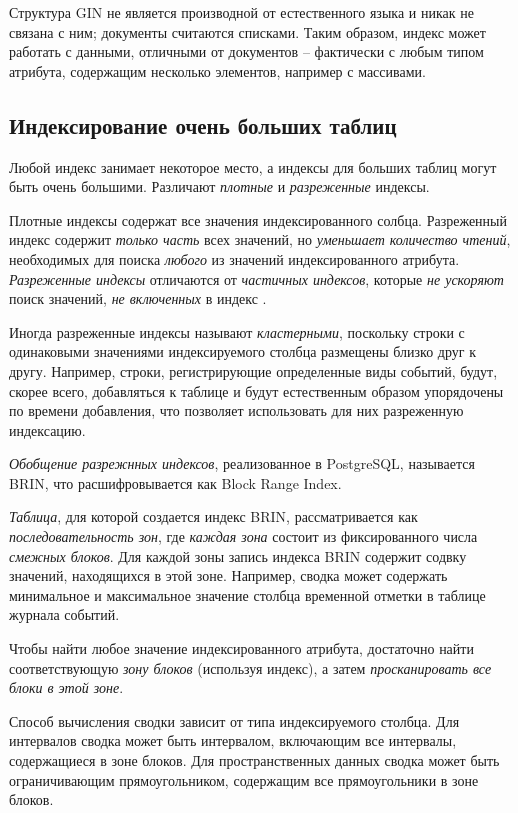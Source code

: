 \documentclass[%
	11pt,
	a4paper,
	utf8,
		]{article}
\begin{document}
Структура GIN не является производной от естественного языка и никак не связана с ним; документы считаются списками. Таким образом, индекс может работать с данными, отличными от документов -- фактически с любым типом атрибута, содержащим несколько элементов, например с массивами.

\subsection{Индексирование очень больших таблиц}

Любой индекс занимает некоторое место, а индексы для больших таблиц могут быть очень большими. Различают \emph{плотные} и \emph{разреженные} индексы.

Плотные индексы содержат все значения индексированного солбца. Разреженный индекс содержит \emph{только часть} всех значений, но \emph{уменьшает количество чтений}, необходимых для поиска \emph{любого} из значений индексированного атрибута. \emph{Разреженные индексы} отличаются от \emph{частичных индексов}, которые \emph{не ускоряют} поиск значений, \emph{не включенных} в индекс \cite[]{dombrovskaya:postgresql-2022}.

Иногда разреженные индексы называют \emph{кластерными}, поскольку строки с одинаковыми значениями индексируемого столбца размещены близко друг к другу. Например, строки, регистрирующие определенные виды событий, будут, скорее всего, добавляться к таблице и будут естественным образом упорядочены по времени добавления, что позволяет использовать для них разреженную индексацию.

\emph{Обобщение разрежнных индексов}, реализованное в PostgreSQL, называется BRIN, что расшифровывается как Block Range Index.

\emph{Таблица}, для которой создается индекс BRIN, рассматривается как \emph{последовательность зон}, где \emph{каждая зона} состоит из фиксированного числа \emph{смежных блоков}. Для каждой зоны запись индекса BRIN содержит содвку значений, находящихся в этой зоне. Например, сводка может содержать минимальное и максимальное значение столбца временной отметки в таблице журнала событий.

Чтобы найти любое значение индексированного атрибута, достаточно найти соответствующую \emph{зону блоков} (используя индекс), а затем \emph{просканировать все блоки в этой зоне}.

Способ вычисления сводки зависит от типа индексируемого столбца. Для интервалов сводка может быть интервалом, включающим все интервалы, содержащиеся в зоне блоков. Для пространственных данных сводка может быть ограничивающим прямоугольником, содержащим все прямоугольники в зоне блоков.
\end{document}
